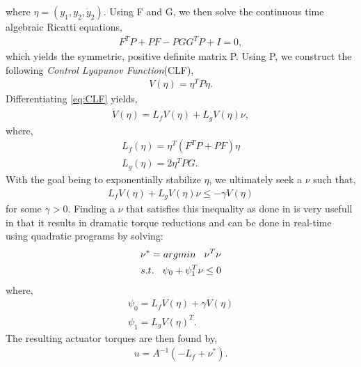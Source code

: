 where $\eta = (y_{1},y_{2},\dot{y}_{2})$. Using F and G, we then solve the continuous time algebraic Ricatti equations,
\begin{align}
\label{eq:care}
  F^{T}P + PF - PGG^{T}P + I = 0,
\end{align}
which yields the symmetric, positive definite matrix P. Using P, we construct the following \emph{Control Lyapunov Function}(CLF),
\begin{align}
\label{eq:CLF}
  V(\eta) = \eta^{T}P\eta.
\end{align}
Differentiating \eqref{eq:CLF} yields,
\begin{align}
\label{eq:Vdot}
 \dot{V}(\eta) = L_{f}V(\eta) + L_{g}V(\eta)\nu,
\end{align}
where,
\begin{align}
 L_{f}(\eta) = \eta^{T}(F^{T}P + PF)\eta \\
 L_{g}(\eta) = 2\eta^{T}PG. \nonumber
\end{align}
With the goal being to exponentially stabilize $\eta$, we ultimately seek a $\nu$ such that,
\begin{align}
  L_{f}V(\eta) + L_{g}V(\eta)\nu \leq -\gamma V(\eta)
\end{align}
for some $\gamma > 0$. Finding a $\nu$ that satisfies this inequality as done in \cite{AGG:CDC:2012} is very 
usefull in that it results in dramatic torque reductions and can be done in real-time using quadratic 
programs by solving:
\begin{align}
\label{eq:QP1}
 \nu^{*} = argmin \hspace{3mm} \nu^{T} \nu \\
 \vspace{3mm} s.t.\hspace{3mm} \psi_{0} + \psi^{T}_{1}\nu \leq 0 \nonumber
\end{align}
where,
\begin{align}
 \psi_{0} = L_{f}V(\eta) + \gamma V(\eta) \\
 \psi_{1} = L_{g}V(\eta)^{T}. \nonumber
\end{align}
The resulting actuator torques are then found by,
\begin{align}
 u = A^{-1}(-L_{f} + \nu^{*}).
\end{align}

